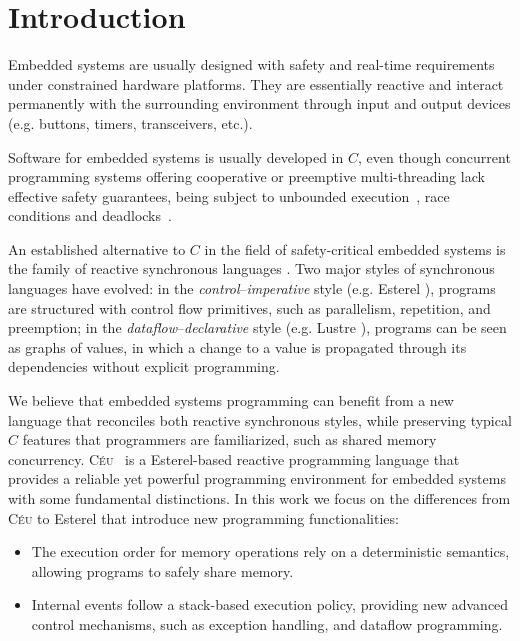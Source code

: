 \documentclass{acm_proc_article-sp}
\newcommand{\CEU}{\textsc{C\'{e}u}\xspace}
\newcommand{\1}{\;}
\newcommand{\2}{\;\;}
\newcommand{\3}{\;\;\;}
\newcommand{\5}{\;\;\;\;\;}
\begin{document}


\section{Introduction}

Embedded systems are usually designed with safety and real-time requirements 
under constrained hardware platforms.
%
They are essentially reactive and interact permanently with the surrounding 
environment through input and output devices (e.g. buttons, timers, 
transceivers, etc.).

Software for embedded systems is usually developed in $C$, even though 
concurrent programming systems offering cooperative or preemptive 
multi-threading lack effective safety guarantees, being subject to unbounded 
execution~\cite{wsn.comparison}, race conditions and 
deadlocks~\cite{sync_async.threadsproblems}.

An established alternative to $C$ in the field of safety-critical embedded 
systems is the family of reactive synchronous languages \cite{rp.twelve}.
Two major styles of synchronous languages have evolved:
in the \emph{control}--\emph{imperative} style (e.g. Esterel 
\cite{esterel.design}), programs are structured with control flow primitives, 
such as parallelism, repetition, and preemption;
in the \emph{dataflow}--\emph{declarative} style (e.g. Lustre 
\cite{lustre.ieee91}), programs can be seen as graphs of values, in which a 
change to a value is propagated through its dependencies without explicit 
programming.

We believe that embedded systems programming can benefit from a new language 
that reconciles both reactive synchronous styles, while preserving typical $C$ 
features that programmers are familiarized, such as shared memory concurrency.
%
\CEU~\cite{ceu.sensys}
is a Esterel-based reactive programming language that provides a reliable yet 
powerful programming environment for embedded systems with some fundamental 
distinctions.
In this work we focus on the differences from \CEU to Esterel that introduce 
new programming functionalities:

%
\begin{itemize}
\item The execution order for memory operations rely on a deterministic 
semantics, allowing programs to safely share memory.
%
\item Internal events follow a stack-based execution policy, providing new 
advanced control mechanisms, such as exception handling, and dataflow 
programming.
\end{itemize}
\end{document}
